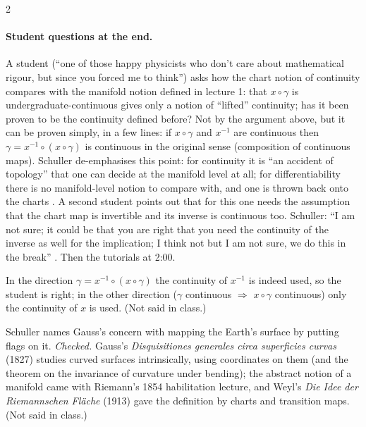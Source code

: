 \begin{paracol}{2}
\paragraph{Student questions at the end.} A student (``one of those happy physicists who don't care about mathematical rigour, but since you forced me to think'') asks how the chart notion of continuity compares with the manifold notion defined in lecture 1: that $x\circ\gamma$ is undergraduate-continuous gives only
a notion of ``lifted'' continuity; has it been proven to be the continuity defined before? Not by the argument above, but it can be proven simply, in a few lines: if $x\circ\gamma$ and $x^{-1}$ are continuous then $\gamma=x^{-1}\circ(x\circ\gamma)$ is continuous in the original sense
(composition of continuous maps). Schuller de-emphasises this point: for continuity it is ``an accident of topology'' that one can decide at the manifold level at all; for differentiability there is no manifold-level notion to compare with, and one is thrown back onto the charts
.
A second student points out that for this one needs the assumption that the chart map is invertible and its inverse is continuous too. Schuller: ``I am not sure; it could be that you are right that you need the continuity of the inverse as well for the implication; I think not but I am not sure,
we do this in the break'' . Then the tutorials at 2:00.
\begin{coursenote}
In the direction $\gamma=x^{-1}\circ(x\circ\gamma)$ the continuity of $x^{-1}$ is indeed used, so the student is right; in the other direction ($\gamma$ continuous $\Rightarrow$ $x\circ\gamma$ continuous) only the continuity of $x$ is used. (Not said in class.)
\end{coursenote}

\begin{history}
Schuller names Gauss's concern with mapping the Earth's surface by putting flags on it. \emph{Checked.} Gauss's \emph{Disquisitiones generales circa superficies curvas} (1827) studies curved surfaces intrinsically, using coordinates on them (and the theorem on the invariance of curvature under bending); the abstract notion of a manifold came with Riemann's 1854 habilitation lecture, and Weyl's
\emph{Die Idee der Riemannschen Fl\"ache} (1913) gave the definition by charts and transition maps. (Not said in class.)
\end{history}


\end{paracol}
